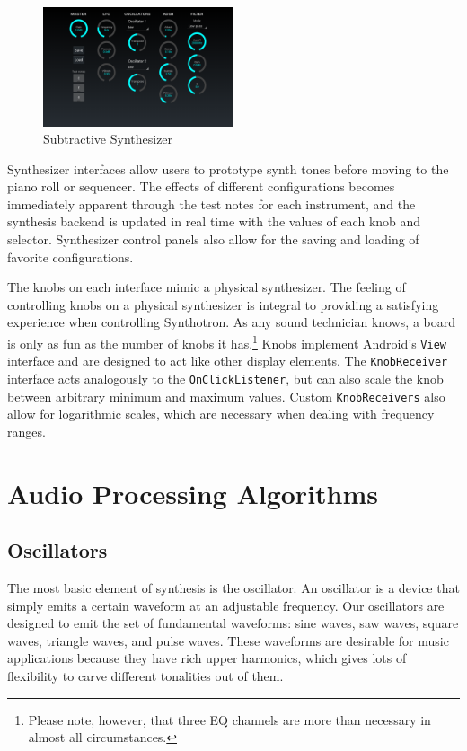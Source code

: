 \documentclass[letterpaper,12pt]{article}
\begin{document}
\begin{figure}[h]
\centering
\includegraphics[width=0.5\textwidth]{figures/subtractivesynth.png}
\caption{Subtractive Synthesizer}
\label{fig:subtractivesynth}
\end{figure}

Synthesizer interfaces allow users to prototype synth tones before moving to the piano roll or sequencer. The effects of different configurations becomes immediately apparent through the test notes for each instrument, and the synthesis backend is updated in real time with the values of each knob and selector. Synthesizer control panels also allow for the saving and loading of favorite configurations.


The knobs on each interface mimic a physical synthesizer. The feeling of controlling knobs on a physical synthesizer is integral to providing a satisfying experience when controlling Synthotron. As any sound technician knows, a board is only as fun as the number of knobs it has.\footnote{Please note, however, that three EQ channels are more than necessary in almost all circumstances.} Knobs implement Android's \texttt{View} interface and are designed to act like other display elements. The \texttt{KnobReceiver} interface acts analogously to the \texttt{OnClickListener}, but can also scale the knob between arbitrary minimum and maximum values. Custom \texttt{KnobReceivers} also allow for logarithmic scales, which are necessary when dealing with frequency ranges.
\section{Audio Processing Algorithms}

\subsection{Oscillators}

The most basic element of synthesis is the oscillator. An oscillator is a device that simply emits a certain waveform at an adjustable frequency. Our oscillators are designed to emit the set of fundamental waveforms: sine waves, saw waves, square waves, triangle waves, and pulse waves. These waveforms are desirable for music applications because they have rich upper harmonics, which gives lots of flexibility to carve different tonalities out of them.
\end{document}
